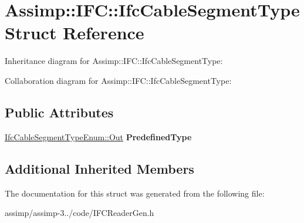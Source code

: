 \hypertarget{struct_assimp_1_1_i_f_c_1_1_ifc_cable_segment_type}{\section{Assimp\+:\+:I\+F\+C\+:\+:Ifc\+Cable\+Segment\+Type Struct Reference}
\label{struct_assimp_1_1_i_f_c_1_1_ifc_cable_segment_type}
}


Inheritance diagram for Assimp\+:\+:I\+F\+C\+:\+:Ifc\+Cable\+Segment\+Type\+:


Collaboration diagram for Assimp\+:\+:I\+F\+C\+:\+:Ifc\+Cable\+Segment\+Type\+:
\subsection*{Public Attributes}
\begin{DoxyCompactItemize}
\item 
\hypertarget{struct_assimp_1_1_i_f_c_1_1_ifc_cable_segment_type_abbddd953b46503a7c5650c018d8b1fa8}{\hyperlink{classboost_1_1shared__ptr}{Ifc\+Cable\+Segment\+Type\+Enum\+::\+Out} {\bfseries Predefined\+Type}}\label{struct_assimp_1_1_i_f_c_1_1_ifc_cable_segment_type_abbddd953b46503a7c5650c018d8b1fa8}

\end{DoxyCompactItemize}
\subsection*{Additional Inherited Members}


The documentation for this struct was generated from the following file\+:\begin{DoxyCompactItemize}
\item 
assimp/assimp-\/3../code/I\+F\+C\+Reader\+Gen.\+h\end{DoxyCompactItemize}
